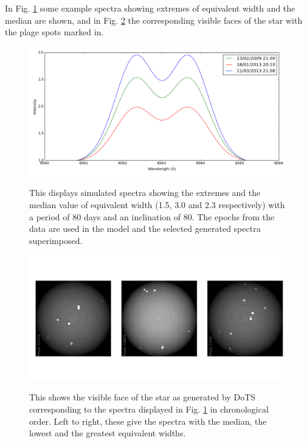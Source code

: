 In Fig. \ref{fig:extremew} some example spectra showing extremes of equivalent width and the median  are shown, and in
Fig. \ref{fig:extremewpics} the corresponding visible faces of the star with the plage spots marked in.

\begin{figure}[!htbp]
\begin{center}
\includegraphics[scale=0.40]{Figures/extremes.png} \\
\end{center}
\caption{This displays simulated spectra showing the extremes and the median value of equivalent width (1.5, 3.0 and 2.3
  respectively) with a period of 80 days and an inclination of 80\degree. The epochs from the {\harps} data are used in
  the model and the selected generated spectra superimposed.}
\protect\label{fig:extremew}
\end{figure}

\begin{figure}[!htbp]
\begin{center}
\includegraphics[scale=0.18]{Figures/extremeewpics.png} \\
\end{center}
\caption{This shows the visible face of the star as generated by DoTS corresponding to the spectra displayed in
  Fig. \ref{fig:extremew} in chronological order. Left to right, these give the spectra with the median, the lowest and
  the greatest equivalent widths.}
\protect\label{fig:extremewpics}
\end{figure}

